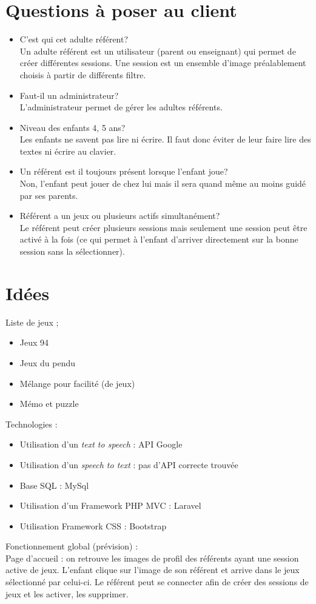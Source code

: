 \documentclass[12pt,a4paper]{report}
\begin{document}
\chapter{Questions à poser au client}

\begin{itemize}
\item C'est qui cet adulte référent?\\
Un adulte référent est un utilisateur (parent ou enseignant) qui permet de créer différentes sessions. Une session est un ensemble d'image préalablement choisis à partir de différents filtre.
\item Faut-il un administrateur?\\
L'administrateur permet de gérer les adultes référents.
\item Niveau des enfants 4, 5 ans?\\
Les enfants ne savent pas lire ni écrire. Il faut donc éviter de leur faire lire des textes ni écrire au clavier.
\item Un référent est il toujours présent lorsque l'enfant joue?\\
Non, l'enfant peut jouer de chez lui mais il sera quand même au moins guidé par ses parents.
\item Référent a un jeux ou plusieurs actifs simultanément?\\
Le référent peut créer plusieurs sessions mais seulement une session peut être activé à la fois (ce qui permet à l'enfant d'arriver directement sur la bonne session sans la sélectionner).
\end{itemize}

\chapter{Idées}

Liste de jeux ;
\begin{itemize}
\item Jeux 94
\item Jeux du pendu
\item Mélange pour facilité (de jeux)
\item Mémo et puzzle
\end{itemize}

\medbreak
Technologies :
\begin{itemize}
\item Utilisation d'un \emph{text to speech} : API Google
\item Utilisation d'un \emph{speech to text} : pas d'API correcte trouvée
\item Base SQL : MySql
\item Utilisation d'un Framework PHP MVC : Laravel
\item Utilisation Framework CSS : Bootstrap
\end{itemize}

\medbreak
Fonctionnement global (prévision) :
\\Page d'accueil : on retrouve les images de profil des référents ayant une session active de jeux.
L'enfant clique sur l'image de son référent et arrive dans le jeux sélectionné par celui-ci.
Le référent peut se connecter afin de créer des sessions de jeux et les activer, les supprimer.\\
\end{document}
